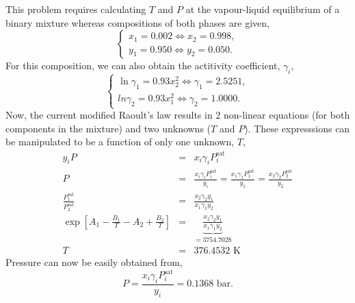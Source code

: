 \documentclass[12pts,a4paper,amsmath,amssymb,floatfix]{article}%
\newcommand{\frc}{\displaystyle\frac}
\begin{document}
\begin{enumerate}[1)]
        This problem requires calculating $T$ and $P$ at the vapour-liquid equilibrium of a binary mixture whereas compositions of both phases are given,
            \begin{displaymath}
               \begin{cases}
                  x_{1} = 0.002 \Leftrightarrow x_{2} = 0.998,\\
                  y_{1} = 0.950 \Leftrightarrow y_{2} = 0.050.
               \end{cases}
            \end{displaymath}
            For this composition, we can also obtain the actitivity coefficient, $\gamma_{i}$,
            \begin{displaymath}
               \begin{cases}
                  \ln{\gamma_{1}} = 0.93x_{2}^{2} \Leftrightarrow \gamma_{1} = 2.5251,\\
                   ln{\gamma_{2}} = 0.93x_{1}^{2} \Leftrightarrow \gamma_{2} = 1.0000.
               \end{cases}
            \end{displaymath}
            Now, the current modified Raoult's law results in 2 non-linear equations (for both components in the mixture) and two unknowns ($T$ and $P$). These expresssions can be manipulated to be a function of only one unknown, $T$,
            \begin{eqnarray}
                y_{i} P &=& x_{i}\gamma_{i}P_{i}^{\text{sat}} \nonumber \\
                     P &=& \frc{x_{i}\gamma_{i}P_{i}^{\text{sat}}}{y_{i}} =  \frc{x_{1}\gamma_{1}P_{1}^{\text{sat}}}{y_{1}} = \frc{x_{2}\gamma_{2}P_{2}^{\text{sat}}}{y_{2}} \nonumber \\
                \frc{P_{1}^{\text{sat}}}{P_{2}^{\text{sat}}}  &=& \frc{x_{2}\gamma_{2}y_{1}}{x_{1}\gamma_{1}y_{2}} \nonumber \\
                \exp{\left[A_{1}-\frc{B_{1}}{T}-A_{2}+\frc{B_{2}}{T}\right]} &=& \underbrace{\frc{x_{2}\gamma_{2}y_{1}}{x_{1}\gamma_{1}y_{2}}}_{= 3754.7028} \nonumber \\
                         T&=& 376.4532\text{ K} \nonumber
            \end{eqnarray}
            Pressure can now be easily obtained from,
            \begin{displaymath}
                 P = \frc{x_{i}\gamma_{i}P_{i}^{\text{sat}}}{y_{i}} = 0.1368\text{ bar}.
            \end{displaymath}
            

\end{enumerate}
\end{document}
